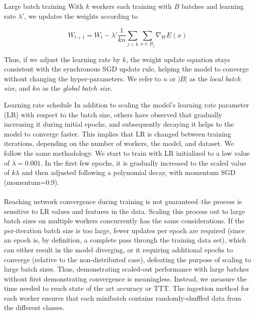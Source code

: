 \begin{section}{Large batch training}
	With $k$ workers each training with $B$ batches and learning rate $\lambda'$, we updates the weights according to

	\begin{equation}
		W_{t+1} = W_{t} - \lambda' \frac{1}{kn} \sum_{j < k} \sum_{x \in B_j} \nabla_{W}E(x)
		\label{eq:syncsgdmw}
	\end{equation}

	Thus, if we adjust the learning rate by $k$, the weight update equation stays consistent with the synchronous SGD update rule, helping the model to converge without changing the hyper-parameters. We refer to $n$ or $|B|$ as the \textit{local batch size}, and $kn$ as the \textit{global batch size}.

	\begin{subsection}{Learning rate schedule}
		\label{sec:lr}
		\noindent In addition to scaling the model's learning rate parameter (LR) with respect to the batch size, others \cite{You2017} have observed that gradually increasing it during initial epochs, and subsequently decaying it helps to the model to converge faster. This implies that LR is changed between training iterations, depending on the number of workers, the model, and dataset. We follow the same methodology. We start to train with LR initialized to a low value of $\lambda = 0.001$. In the first few epochs, it is gradually increased to the scaled value of $k\lambda$ and then adjusted following a polynomial decay, with momentum SGD (momentum=0.9).\\\\
\noindent Reaching network convergence during training is not guaranteed--the process is sensitive to LR values and features in the data. Scaling this process out to large batch sizes on multiple workers concurrently has the same considerations. If the per-iteration batch size is too large, fewer updates per epoch are required (since an epoch is, by definition, a complete pass through the training data set), which can either result in the model diverging, or it requiring additional epochs to converge (relative to the non-distributed case), defeating the purpose of scaling to large batch sizes. Thus, demonstrating scaled-out performance with large batches without first demonstrating convergence is meaningless. Instead, we measure the time needed to reach state of the art accuracy or TTT. The ingestion method for each worker ensures that each minibatch contains randomly-shuffled data from the different classes.
	\end{subsection}
\end{section}





